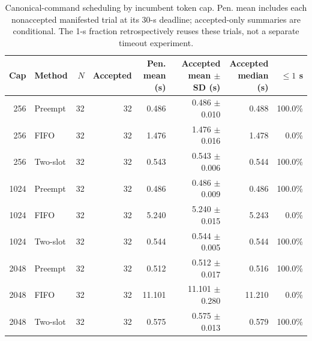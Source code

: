 \begin{table}[htbp]
\centering\small
\setlength{\tabcolsep}{3pt}
\caption{Canonical-command scheduling by incumbent token cap. Pen. mean includes each nonaccepted manifested trial at its 30-s deadline; accepted-only summaries are conditional. The 1-s fraction retrospectively reuses these trials, not a separate timeout experiment.}
\label{tab:v3_scheduler}
\begin{tabular}{rlrrrrrr}
\toprule
Cap & Method & $N$ & Accepted & \shortstack{Pen. mean\\(s)} & \shortstack{Accepted mean\\$\pm$ SD (s)} & \shortstack{Accepted\\median (s)} & $\leq1$ s \\
\midrule
256 & Preempt & 32 & 32 & 0.486 & 0.486 $\pm$ 0.010 & 0.488 & 100.0\% \\
256 & FIFO & 32 & 32 & 1.476 & 1.476 $\pm$ 0.016 & 1.478 & 0.0\% \\
256 & Two-slot & 32 & 32 & 0.543 & 0.543 $\pm$ 0.006 & 0.544 & 100.0\% \\
1024 & Preempt & 32 & 32 & 0.486 & 0.486 $\pm$ 0.009 & 0.486 & 100.0\% \\
1024 & FIFO & 32 & 32 & 5.240 & 5.240 $\pm$ 0.015 & 5.243 & 0.0\% \\
1024 & Two-slot & 32 & 32 & 0.544 & 0.544 $\pm$ 0.005 & 0.544 & 100.0\% \\
2048 & Preempt & 32 & 32 & 0.512 & 0.512 $\pm$ 0.017 & 0.516 & 100.0\% \\
2048 & FIFO & 32 & 32 & 11.101 & 11.101 $\pm$ 0.280 & 11.210 & 0.0\% \\
2048 & Two-slot & 32 & 32 & 0.575 & 0.575 $\pm$ 0.013 & 0.579 & 100.0\% \\
\bottomrule
\end{tabular}
\end{table}
